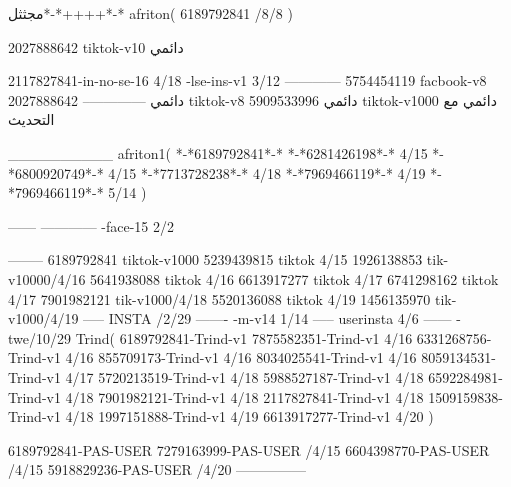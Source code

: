 مجثثل*-*++++*-*
afriton(
6189792841 /8/8
)

2027888642 tiktok-v10
دائمي

2117827841-in-no-se-16 4/18
-lse-ins-v1 3/12
------------
5754454119 facbook-v8
دائمي
--------------
2027888642 tiktok-v8
دائمي
5909533996 tiktok-v1000
دائمي مع التحديث

__________
afriton1(
*-*6189792841*-*
*-*6281426198*-* 4/15
*-*6800920749*-* 4/15
*-*7713728238*-* 4/18
*-*7969466119*-* 4/19
*-*7969466119*-* 5/14
)


------
------------
-face-15 2/2

--------
6189792841 tiktok-v1000
5239439815 tiktok 4/15
1926138853 tik-v10000/4/16
5641938088 tiktok 4/16
6613917277 tiktok 4/17
6741298162 tiktok 4/17
7901982121 tik-v1000/4/18
5520136088 tiktok 4/19
1456135970 tik-v1000/4/19
-----
 INSTA /2/29
-------
-m-v14 1/14
-----
userinsta 4/6
------
-twe/10/29
Trind(
6189792841-Trind-v1 
7875582351-Trind-v1  4/16
6331268756-Trind-v1  4/16
855709173-Trind-v1  4/16
8034025541-Trind-v1  4/16
8059134531-Trind-v1  4/17
5720213519-Trind-v1  4/18
5988527187-Trind-v1  4/18
6592284981-Trind-v1  4/18
7901982121-Trind-v1  4/18
2117827841-Trind-v1  4/18
1509159838-Trind-v1  4/18
1997151888-Trind-v1  4/19
6613917277-Trind-v1  4/20
)

6189792841-PAS-USER
7279163999-PAS-USER /4/15
6604398770-PAS-USER /4/15
5918829236-PAS-USER /4/20
    ---------------
